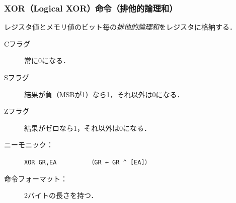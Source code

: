 \documentclass{beamer}                 %
\begin{document}
\begin{frame}
  \frametitle{XOR（Logical XOR）命令（排他的論理和）}
  レジスタ値とメモリ値のビット毎の\emph{排他的論理和}をレジスタに格納する．
  \vfill
  \begin{description}
  \item[Cフラグ] 常に0になる．
  \item[Sフラグ] 結果が負（MSBが1）なら1，それ以外は0になる．
  \item[Zフラグ] 結果がゼロなら1，それ以外は0になる．
    \vfill
  \item[ニーモニック：]\texttt{XOR GR,EA}~~~~~~~~~\texttt{（GR ← GR \textasciicircum{} [EA]）}
    \vfill
  \item[命令フォーマット：] 2バイトの長さを持つ．\\
    {\small{}}
    \vfill
  \end{description}
  \vfill
\end{frame}
\end{document}
